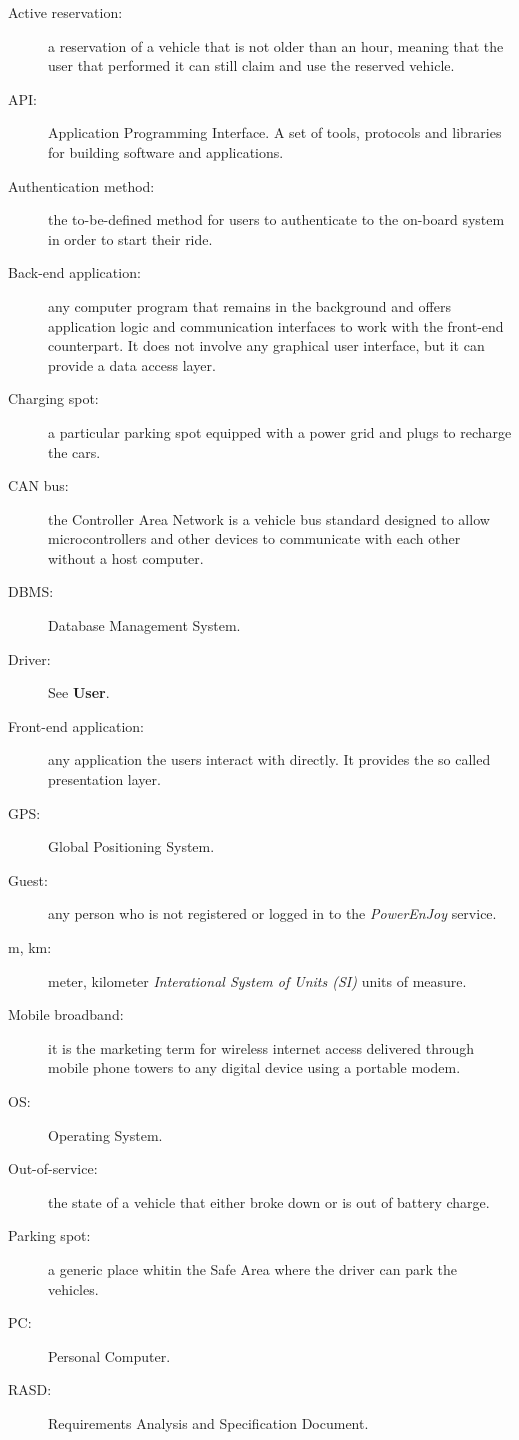 \begin{description}
\item[Active reservation:] a reservation of a vehicle that is not older than an hour, meaning that the user that performed it can still claim and use the reserved vehicle.
\item[API:] Application Programming Interface. A set of tools, protocols and libraries for building software and applications.
\item[Authentication method:] the to-be-defined method for users to authenticate to the on-board system in order to start their ride.
\item[Back-end application:] any computer program that remains in the background and offers application logic and communication interfaces to work with the front-end counterpart. It does not involve any graphical user interface, but it can provide a data access layer.
\item[Charging spot:] a particular parking spot equipped with a power grid and plugs to recharge the cars.
\item[CAN bus:] the Controller Area Network is a vehicle bus standard designed to allow microcontrollers and other devices to communicate with each other without a host computer.
\item[DBMS:] Database Management System.
\item[Driver:] See \textbf{User}.
\item[Front-end application:] any application the users interact with directly. It provides the so called presentation layer.
\item[GPS:] Global Positioning System.
\item[Guest:] any person who is not registered or logged in to the \emph{PowerEnJoy} service.
\item[m, km:] meter, kilometer \emph{Interational System of Units (SI)} units of measure.
\item[Mobile broadband:] it is the marketing term for wireless internet access delivered through mobile phone towers to any digital device using a portable modem.
\item[OS:] Operating System.
\item[Out-of-service:] the state of a vehicle that either broke down or is out of battery charge.
\item[Parking spot:] a generic place whitin the Safe Area where the driver can park the vehicles.
\item[PC:] Personal Computer.
\item[RASD:] Requirements Analysis and Specification Document.

\end{description}
